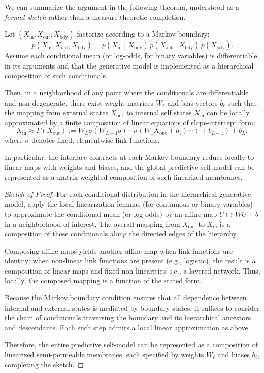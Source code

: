 \documentclass[12pt,letterpaper]{article}
\begin{document}
We can summarize the argument in the following theorem, understood as a \emph{formal sketch} rather than a measure-theoretic completion.

\begin{theorem}
Let $(X_{\text{in}}, X_{\text{out}}, X_{\text{bdy}})$ factorize according to a Markov boundary:
\[
p(X_{\text{in}}, X_{\text{out}}, X_{\text{bdy}})
= p(X_{\text{in}} \mid X_{\text{bdy}})\, p(X_{\text{out}} \mid X_{\text{bdy}})\, p(X_{\text{bdy}}).
\]
Assume each conditional mean (or log-odds, for binary variables) is differentiable in its arguments and that the generative model is implemented as a hierarchical composition of such conditionals.

Then, in a neighborhood of any point where the conditionals are differentiable and non-degenerate, there exist weight matrices $W_\ell$ and bias vectors $b_\ell$ such that the mapping from external states $X_{\text{out}}$ to internal self states $X_{\text{in}}$ can be locally approximated by a finite composition of linear equations of slope-intercept form:
\[
X_{\text{in}} \approx F(X_{\text{out}}) := W_L \sigma(W_{L-1} \sigma(\cdots \sigma(W_1 X_{\text{out}} + b_1) \cdots ) + b_{L-1}) + b_L,
\]
where $\sigma$ denotes fixed, elementwise link functions.

In particular, the interface contracts at each Markov boundary reduce locally to linear maps with weights and biases, and the global predictive self-model can be represented as a matrix-weighted composition of such linearized membranes.
\end{theorem}

\begin{proof}[Sketch of Proof]
For each conditional distribution in the hierarchical generative model, apply the local linearization lemmas (for continuous or binary variables) to approximate the conditional mean (or log-odds) by an affine map $U \mapsto W U + b$ in a neighborhood of interest. The overall mapping from $X_{\text{out}}$ to $X_{\text{in}}$ is a composition of these conditionals along the directed edges of the hierarchy.

Composing affine maps yields another affine map when link functions are identity; when non-linear link functions are present (e.g., logistic), the result is a composition of linear maps and fixed non-linearities, i.e., a layered network. Thus, locally, the composed mapping is a function of the stated form.

Because the Markov boundary condition ensures that all dependence between internal and external states is mediated by boundary states, it suffices to consider the chain of conditionals traversing the boundary and its hierarchical ancestors and descendants. Each such step admits a local linear approximation as above.

Therefore, the entire predictive self-model can be represented as a composition of linearized semi-permeable membranes, each specified by weights $W_\ell$ and biases $b_\ell$, completing the sketch.
\end{proof}
\end{document}
